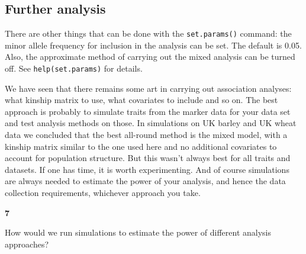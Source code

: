 \documentclass[
]{book}
\makeatletter
\newenvironment{kframe}{%
\medskip{}
\setlength{\fboxsep}{.8em}
 \def\at@end@of@kframe{}%
 \ifinner\ifhmode%
  \def\at@end@of@kframe{\end{minipage}}%
  \begin{minipage}{\columnwidth}%
 \fi\fi%
 \def\FrameCommand##1{\hskip\@totalleftmargin \hskip-\fboxsep
 \colorbox{shadecolor}{##1}\hskip-\fboxsep
     \hskip-\linewidth \hskip-\@totalleftmargin \hskip\columnwidth}%
 \MakeFramed {\advance\hsize-\width
   \@totalleftmargin\z@ \linewidth\hsize
   \@setminipage}}%
 {\par\unskip\endMakeFramed%
 \at@end@of@kframe}
\newenvironment{rmdblock}[1]
  {
  \begin{itemize}
  \renewcommand{\labelitemi}{
    \raisebox{-.7\height}[0pt][0pt]{
      {\setkeys{Gin}{width=3em,keepaspectratio}\texttt{[image: images/\#1]}}
    }
  }
  \setlength{\fboxsep}{1em}
  \begin{kframe}
  \item
  }
  {
  \end{kframe}
  \end{itemize}
  }
\newenvironment{rmdquiz}
  {\begin{rmdblock}{quiz}}
  {\end{rmdblock}}
\makeatother
\begin{document}
\hypertarget{further-analysis}{%
\subsection{Further analysis}\label{further-analysis}}

There are other things that can be done with the \texttt{set.params()} command: the minor allele frequency for inclusion in the analysis can be set. The default is 0.05. Also, the approximate method of carrying out the mixed analysis can be turned off. See \texttt{help(set.params)} for details.

We have seen that there remains some art in carrying out association analyses: what kinship matrix to use, what covariates to include and so on. The best approach is probably to simulate traits from the marker data for your data set and test analysis methods on those. In simulations on UK barley and UK wheat data we concluded that the best all-round method is the mixed model, with a kinship matrix similar to the one used here and no additional covariates to account for population structure. But this wasn't always best for all traits and datasets. If one has time, it is worth experimenting. And of course simulations are always needed to estimate the power of your analysis, and hence the data collection requirements, whichever approach you take.

\begin{rmdquiz}
\textbf{7}

How would we run simulations to estimate the power of different analysis approaches?
\end{rmdquiz}

\backmatter

  

\printindex
\end{document}
